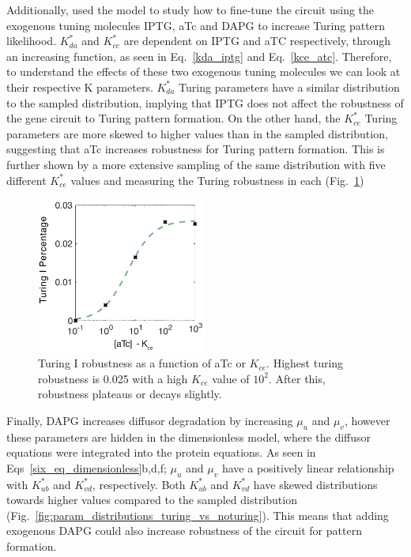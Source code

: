 Additionally, used the model to study how to fine-tune the circuit using the exogenous tuning molecules IPTG, aTc and DAPG to increase Turing pattern likelihood.
$K_{da}^*$  and $K_{ce}^*$ are dependent on IPTG and aTC respectively, through an increasing function,
as seen in Eq.~\ref{kda_iptg} and Eq.~\ref{kce_atc}.
Therefore,
to understand the effects of these two exogenous tuning molecules we can look at their respective K parameters.
$K_{da}^*$ Turing parameters have a similar distribution to the sampled distribution,
implying that IPTG does not affect the robustness of the gene circuit to Turing pattern formation.
On the other hand, the $K_{ce}^*$ Turing parameters are more skewed to higher values than in the sampled distribution,
suggesting that aTc increases robustness for Turing pattern formation.
This is further shown by a more extensive sampling of the same distribution with five different $K_{ce}^*$ values
and measuring the Turing robustness in each
(Fig.~\ref{fig:atc_robustness})

\begin{figure}[H] %
    \centering
    \begin{adjustbox}{center}
        \includegraphics[width=0.5\textwidth]{chapters/Chapter 2/atc_robustness} %
    \end{adjustbox}
    \caption{Turing I robustness as a function of aTc or $K_{ce}$. Highest turing robustness is 0.025 with a high $K_{ce}$ value of $10^2$. After this, robustness plateaus or decays slightly. }
    \label{fig:atc_robustness} %
\end{figure}

Finally, DAPG increases diffusor degradation by increasing $\mu_u$ and $\mu_v$,
however these parameters are hidden in the dimensionless model,
where the diffusor equations were integrated into the protein equations.
As seen in Eqs~\ref{six_eq_dimensionless}b,d,f; $\mu_u$
and $\mu_v$ have a positively linear relationship with $K_{ub}^*$ and $K_{vd}^*$, respectively.
Both $K_{ub}^*$ and $K_{vd}^*$ have skewed distributions towards higher values compared to the sampled distribution
(Fig.~\ref{fig:param_distributions_turing_vs_noturing}).
This means that adding exogenous DAPG could also increase robustness of the circuit for pattern formation.

